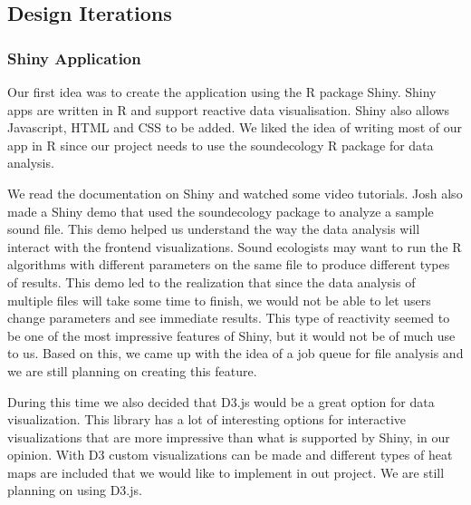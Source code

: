 \subsection{Design Iterations}

\subsubsection{Shiny Application}
Our first idea was to create the application using the R package Shiny. Shiny apps are written in R and support reactive data visualisation. Shiny also allows Javascript, HTML and CSS to be added. We liked the idea of writing most of our app in R since our project needs to use the soundecology R package for data analysis.\par
We read the documentation on Shiny and watched some video tutorials. Josh also made a Shiny demo that used the soundecology package to analyze a sample sound file. This demo helped us understand the way the data analysis will interact with the frontend visualizations. Sound ecologists may want to run the R algorithms with different parameters on the same file to produce different types of results. This demo led to the realization that since the data analysis of multiple files will take some time to finish, we would not be able to let users change parameters and see immediate results. This type of reactivity seemed to be one of the most impressive features of Shiny, but it would not be of much use to us. Based on this, we came up with the idea of a job queue for file analysis and we are still planning on creating this feature.\par
During this time we also decided that D3.js would be a great option for data visualization. This library has a lot of interesting options for interactive visualizations that are more impressive than what is supported by Shiny, in our opinion. With D3 custom visualizations can be made and different types of heat maps are included that we would like to implement in out project. We are still planning on using D3.js.\par

